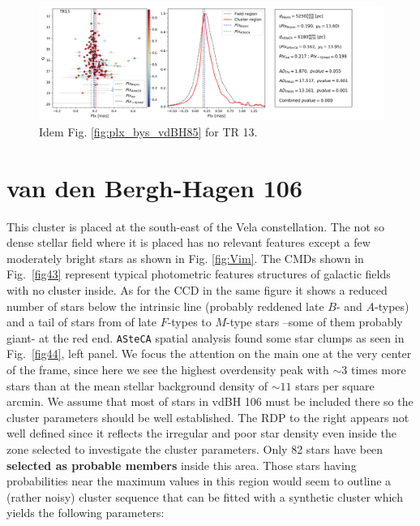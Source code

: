 \documentclass[referee]{aa}
\begin{document}
\begin{figure}[ht]
    \centering
    \includegraphics[width=\hsize]{../figs/plx_TR13.png}
    \caption{Idem Fig. \ref{fig:plx_bys_vdBH85} for TR 13.}
    \label{fig42}
\end{figure}




\section{van den Bergh-Hagen 106}

This cluster is placed at the south-east of the Vela constellation. The not so
dense stellar field where it is placed has no relevant features except a few
moderately bright stars as shown in Fig. \ref{fig:Vim}.
The CMDs shown in Fig.~\ref{fig43} represent typical photometric features
structures of galactic fields with no cluster inside. As for the CCD in the
same figure it shows a reduced number of stars below the intrinsic line 
(probably reddened late $B$- and $A$-types) and a tail of stars from of late
$F$-types to $M$-type stars –some of them probably giant- at the red end.
%
\texttt{ASteCA} spatial analysis found some star clumps as seen in
Fig.~\ref{fig44}, left panel. We focus the attention on the main one at the very
center of the frame, since here we see the highest overdensity peak with
$\sim3$ times more stars than at the mean stellar background density of
$\sim11$ stars per square arcmin.
We assume that most of stars in vdBH 106 must be included there so the cluster
parameters should be well established. The RDP to the right appears not well
defined since it reflects the irregular and poor star density even inside the
zone selected to investigate the cluster parameters.
Only 82 stars have been \textbf{selected as probable members} inside this area.
Those stars having probabilities near the maximum values in this region would
seem to outline a (rather noisy) cluster sequence that can be fitted with a
synthetic cluster which yields the following parameters:
\end{document}

